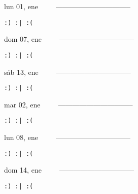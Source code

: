 \documentclass[letterpaper,10pt]{article}
\begin{document}
\begin{multicols}{3}
{lun 01, ene\ \ \ \ \ --------------------------------}
\begin{flushright}\begin{small}\texttt{:) :| :(}\end{small}\end{flushright}
\vfill
{dom 07, ene\ \ \ \ \ --------------------------------}
\begin{flushright}\begin{small}\texttt{:) :| :(}\end{small}\end{flushright}\par
\vfill
{sáb 13, ene\ \ \ \ \ --------------------------------}
\begin{flushright}\begin{small}\texttt{:) :| :(}\end{small}\end{flushright}\par
\vfill
\end{multicols}
\vspace{1.05cm}

\begin{multicols}{3}
{mar 02, ene\ \ \ \ \ --------------------------------}
\begin{flushright}\begin{small}\texttt{:) :| :(}\end{small}\end{flushright}
\vfill
{lun 08, ene\ \ \ \ \ --------------------------------}
\begin{flushright}\begin{small}\texttt{:) :| :(}\end{small}\end{flushright}\par
\vfill
{dom 14, ene\ \ \ \ \ --------------------------------}
\begin{flushright}\begin{small}\texttt{:) :| :(}\end{small}\end{flushright}\par
\vfill
\end{multicols}
\vspace{1.05cm}
\end{document}
